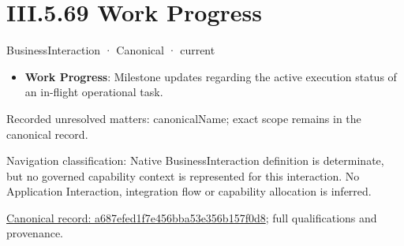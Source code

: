 \section*{III.5.69 Work Progress}
\label{navigation:III.5.69}

\label{element:a687efed1f7e456bba53e356b157f0d8}
{\small BusinessInteraction · Canonical · current}\par

\begin{itemize}


\item \textbf{Work Progress}: Milestone updates regarding the active execution status of an in-flight operational task.

\end{itemize}

{\small Recorded unresolved matters: canonicalName; exact scope remains in the canonical record.}\par
{\small Navigation classification: Native BusinessInteraction definition is determinate, but no governed capability context is represented for this interaction. No Application Interaction, integration flow or capability allocation is inferred.}\par
{\footnotesize \href{../../../../../../../continuum/business/business-interaction/a687efed1f7e456bba53e356b157f0d8.md}{Canonical record: a687efed1f7e456bba53e356b157f0d8}; full qualifications and provenance.}\par

